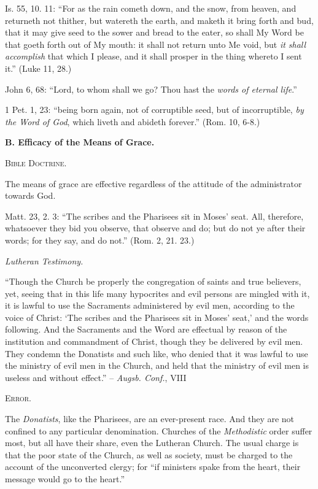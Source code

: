 \documentclass[
]{book}
\begin{document}
Is. 55, 10. 11: ``For as the rain cometh down, and the snow, from heaven, and returneth not thither, but watereth the earth, and maketh it bring forth and bud, that it may give seed to the sower and bread to the eater, so shall My Word be that goeth forth out of My mouth: it shall not return unto Me void, but \emph{it shall accomplish} that which I please, and it shall prosper in the thing whereto I sent it.'' (Luke 11, 28.)

John 6, 68: ``Lord, to whom shall we go? Thou hast the \emph{words of eternal life}.''

1 Pet. 1, 23: ``being born again, not of corruptible seed, but of incorruptible, \emph{by the Word of God}, which liveth and abideth forever.'' (Rom. 10, 6-8.)

\begin{center}
\textbf{B.  Efficacy of the Means of Grace.}

\textsc{Bible Doctrine.}
\end{center}

The means of grace are effective regardless of the attitude of the administrator towards God.

Matt. 23, 2. 3: ``The scribes and the Pharisees sit in Moses' seat. All, therefore, whatsoever they bid you observe, that observe and do; but do not ye after their words; for they say, and do not.'' (Rom. 2, 21. 23.)

\begin{center}
\textsl{Lutheran Testimony.}
\end{center}

``Though the Church be properly the congregation of saints and true believers, yet, seeing that in this life many hypocrites and evil persons are mingled with it, it is lawful to use the Sacraments administered by evil men, according to the voice of Christ: `The scribes and the Pharisees sit in Moses' seat,' and the words following. And the Sacraments and the Word are effectual by reason of the institution and commandment of Christ, though they be delivered by evil men. They condemn the Donatists and such like, who denied that it was lawful to use the ministry of evil men in the Church, and held that the ministry of evil men is useless and without effect.'' -- \emph{Augsb. Conf.}, VIII

\begin{center}
\textsc{Error.}
\end{center}

The \emph{Donatists}, like the Pharisees, are an ever-present race. And they are not confined to any particular denomination. Churches of the \emph{Methodistic} order suffer most, but all have their share, even the Lutheran Church. The usual charge is that the poor state of the Church, as well as society, must be charged to the account of the unconverted clergy; for ``if ministers spake from the heart, their message would go to the heart.''
\end{document}
